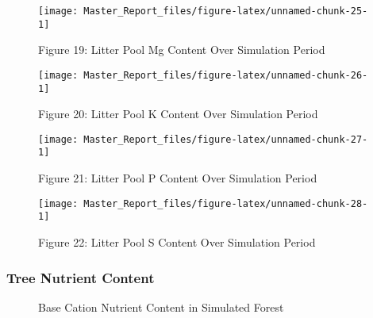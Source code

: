 \documentclass[
]{article}
\begin{document}
\begin{figure}[H]
\texttt{[image: Master\_Report\_files/figure-latex/unnamed-chunk-25-1]} \caption{Figure 19: Litter Pool Mg Content Over Simulation Period}\label{fig:unnamed-chunk-25}
\end{figure}

\begin{figure}[H]
\texttt{[image: Master\_Report\_files/figure-latex/unnamed-chunk-26-1]} \caption{Figure 20: Litter Pool K Content Over Simulation Period}\label{fig:unnamed-chunk-26}
\end{figure}

\begin{figure}[H]
\texttt{[image: Master\_Report\_files/figure-latex/unnamed-chunk-27-1]} \caption{Figure 21: Litter Pool P Content Over Simulation Period}\label{fig:unnamed-chunk-27}
\end{figure}

\begin{figure}[H]
\texttt{[image: Master\_Report\_files/figure-latex/unnamed-chunk-28-1]} \caption{Figure 22: Litter Pool S Content Over Simulation Period}\label{fig:unnamed-chunk-28}
\end{figure}

\hypertarget{tree-nutrient-content}{%
\subsubsection{Tree Nutrient Content}\label{tree-nutrient-content}}

\begin{figure}[H]

{\centering {}\newline{}

}

\caption{Base Cation Nutrient Content in Simulated Forest}\label{fig:unnamed-chunk-29}
\end{figure}
\end{document}
